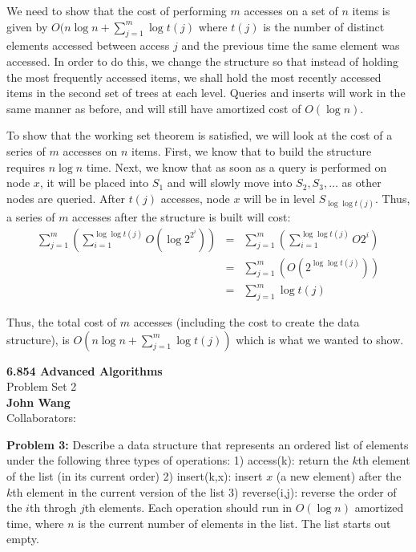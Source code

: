\documentclass[psamsfonts]{amsart}
\newenvironment{sol}{\vspace{0.25cm}{\large \bfseries Solution:}}{\qedsymbol}
\newenvironment{prob}[1]{\begin{framed}{\large \bfseries Problem #1:}}{\end{framed}}
\newcommand{\makenewtitle}{
\begin{center}
{\huge \bfseries 6.854 Advanced Algorithms} \\
Problem Set 2\\
\vspace{0.25cm}
{\bfseries John Wang} \\
Collaborators:
\end{center}
\vspace{0.5cm}
}
\begin{document}
\begin{sol}
We need to show that the cost of performing $m$ accesses on a set of $n$ items is given by $O(n \log n + \sum_{j=1}^m \log t(j)$ where $t(j)$ is the number of distinct elements accessed between access $j$ and the previous time the same element was accessed. In order to do this, we change the structure so that instead of holding the most frequently accessed items, we shall hold the most recently accessed items in the second set of trees at each level. Queries and inserts will work in the same manner as before, and will still have amortized cost of $O(\log n)$. 

To show that the working set theorem is satisfied, we will look at the cost of a series of $m$ accesses on $n$ items. First, we know that to build the structure requires $n \log n$ time. Next, we know that as soon as a query is performed on node $x$, it will be placed into $S_1$ and will slowly move into $S_2, S_3, \ldots$ as other nodes are queried. After $t(j)$ accesses, node $x$ will be in level $S_{\log \log t(j)}$. Thus, a series of $m$ accesses after the structure is built will cost:
\begin{eqnarray}
\sum_{j=1}^m \left( \sum_{i=1}^{\log \log t(j)} O(\log 2^{2^{i}}) \right) &=& \sum_{j=1}^m \left( \sum_{i=1}^{\log \log t(j)} O{2^i} \right) \\
&=& \sum_{j=1}^m \left( O(2^{\log \log t(j)}) \right) \\
&=& \sum_{j=1}^m \log t(j)
\end{eqnarray}

Thus, the total cost of $m$ accesses (including the cost to create the data structure), is $O(n \log n + \sum_{j=1}^m \log t(j))$ which is what we wanted to show.
\end{sol}

\newpage
\makenewtitle

\begin{prob}{3}
Describe a data structure that represents an ordered list of elements under the following three types of operations: 1) access(k): return the $k$th element of the list (in its current order) 2) insert(k,x): insert $x$ (a new element) after the $k$th element in the current version of the list 3) reverse(i,j): reverse the order of the $i$th throgh $j$th elements. Each operation should run in $O(\log n)$ amortized time, where $n$ is the current number of elements in the list. The list starts out empty.
\end{prob}

\begin{sol}

\end{sol}
\end{document}
